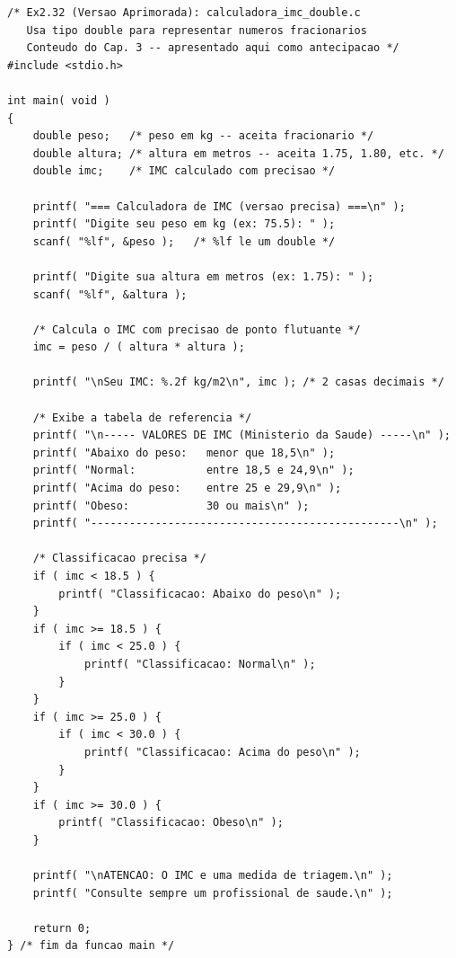 \documentclass[12pt,a4paper]{article}
\begin{document}
\begin{respostabox}
\begin{lstlisting}
/* Ex2.32 (Versao Aprimorada): calculadora_imc_double.c
   Usa tipo double para representar numeros fracionarios
   Conteudo do Cap. 3 -- apresentado aqui como antecipacao */
#include <stdio.h>

int main( void )
{
    double peso;   /* peso em kg -- aceita fracionario */
    double altura; /* altura em metros -- aceita 1.75, 1.80, etc. */
    double imc;    /* IMC calculado com precisao */

    printf( "=== Calculadora de IMC (versao precisa) ===\n" );
    printf( "Digite seu peso em kg (ex: 75.5): " );
    scanf( "%lf", &peso );   /* %lf le um double */

    printf( "Digite sua altura em metros (ex: 1.75): " );
    scanf( "%lf", &altura );

    /* Calcula o IMC com precisao de ponto flutuante */
    imc = peso / ( altura * altura );

    printf( "\nSeu IMC: %.2f kg/m2\n", imc ); /* 2 casas decimais */

    /* Exibe a tabela de referencia */
    printf( "\n----- VALORES DE IMC (Ministerio da Saude) -----\n" );
    printf( "Abaixo do peso:   menor que 18,5\n" );
    printf( "Normal:           entre 18,5 e 24,9\n" );
    printf( "Acima do peso:    entre 25 e 29,9\n" );
    printf( "Obeso:            30 ou mais\n" );
    printf( "------------------------------------------------\n" );

    /* Classificacao precisa */
    if ( imc < 18.5 ) {
        printf( "Classificacao: Abaixo do peso\n" );
    }
    if ( imc >= 18.5 ) {
        if ( imc < 25.0 ) {
            printf( "Classificacao: Normal\n" );
        }
    }
    if ( imc >= 25.0 ) {
        if ( imc < 30.0 ) {
            printf( "Classificacao: Acima do peso\n" );
        }
    }
    if ( imc >= 30.0 ) {
        printf( "Classificacao: Obeso\n" );
    }

    printf( "\nATENCAO: O IMC e uma medida de triagem.\n" );
    printf( "Consulte sempre um profissional de saude.\n" );

    return 0;
} /* fim da funcao main */
\end{lstlisting}


\end{respostabox}
\end{document}
